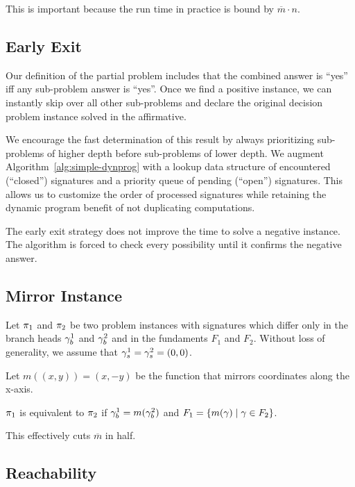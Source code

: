 This is important because the run time in practice is bound by $\overline{m} \cdot n$.

\subsection{Early Exit}
\label{section:ch3_earlyexit}

Our definition of the partial problem includes that the combined answer is ``yes'' iff any sub-problem answer is ``yes''. Once we find a positive instance, we can instantly skip over all other sub-problems and declare the original decision problem instance solved in the affirmative.

We encourage the fast determination of this result by always prioritizing sub-problems of higher depth before sub-problems of lower depth. We augment Algorithm~\ref{alg:simple-dynprog} with a lookup data structure of encountered (``closed'') signatures and a priority queue of pending (``open'') signatures. This allows us to customize the order of processed signatures while retaining the dynamic program benefit of not duplicating computations.

The early exit strategy does not improve the time to solve a negative instance. The algorithm is forced to check every possibility until it confirms the negative answer.

\subsection{Mirror Instance}

Let $\pi_1$ and $\pi_2$ be two problem instances with signatures which differ only in the branch heads $\gamma_b^1$ and $\gamma_b^2$ and in the fundaments $F_1$ and $F_2$. Without loss of generality, we assume that $\gamma_s^1 = \gamma_s^2 = (0, 0)$.

Let $m((x, y)) = (x, -y)$ be the function that mirrors coordinates along the x-axis.

$\pi_1$ is equivalent to $\pi_2$ if $\gamma_b^1 = m(\gamma_b^2)$ and $F_1 = \{m(\gamma) \mid \gamma \in F_2\}$.

This effectively cuts $\overline{m}$ in half.

\subsection{Reachability}

